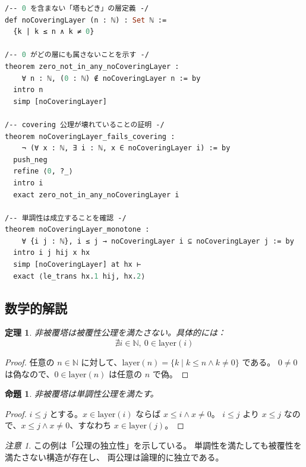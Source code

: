 \documentclass[a4paper,11pt]{ltjsarticle}
\theoremstyle{definition}
\theoremstyle{plain}
\newtheorem{theorem}[definition]{定理}
\newtheorem{proposition}[definition]{命題}
\theoremstyle{remark}
\newtheorem{remark}[definition]{注意}
\newcommand{\N}{\mathbb{N}}
\newcommand{\Layer}{\mathrm{layer}}
\begin{document}
\begin{lstlisting}[language=ML, caption={非被覆塔の Lean 実装}]
/-- 0 を含まない「塔もどき」の層定義 -/
def noCoveringLayer (n : ℕ) : Set ℕ :=
  {k | k ≤ n ∧ k ≠ 0}

/-- 0 がどの層にも属さないことを示す -/
theorem zero_not_in_any_noCoveringLayer :
    ∀ n : ℕ, (0 : ℕ) ∉ noCoveringLayer n := by
  intro n
  simp [noCoveringLayer]

/-- covering 公理が壊れていることの証明 -/
theorem noCoveringLayer_fails_covering :
    ¬ (∀ x : ℕ, ∃ i : ℕ, x ∈ noCoveringLayer i) := by
  push_neg
  refine ⟨0, ?_⟩
  intro i
  exact zero_not_in_any_noCoveringLayer i

/-- 単調性は成立することを確認 -/
theorem noCoveringLayer_monotone :
    ∀ {i j : ℕ}, i ≤ j → noCoveringLayer i ⊆ noCoveringLayer j := by
  intro i j hij x hx
  simp [noCoveringLayer] at hx ⊢
  exact ⟨le_trans hx.1 hij, hx.2⟩
\end{lstlisting}

\subsection{数学的解説}

\begin{theorem}
非被覆塔は被覆性公理を満たさない。具体的には：
\[
    \nexists i \in \N,\ 0 \in \Layer(i)
\]
\end{theorem}

\begin{proof}
任意の $n \in \N$ に対して、$\Layer(n) = \{k \mid k \leq n \land k \neq 0\}$ である。
$0 \neq 0$ は偽なので、$0 \in \Layer(n)$ は任意の $n$ で偽。
\end{proof}

\begin{proposition}
非被覆塔は単調性公理を満たす。
\end{proposition}

\begin{proof}
$i \leq j$ とする。$x \in \Layer(i)$ ならば $x \leq i \land x \neq 0$。
$i \leq j$ より $x \leq j$ なので、$x \leq j \land x \neq 0$、すなわち $x \in \Layer(j)$。
\end{proof}

\begin{remark}
この例は「公理の独立性」を示している。
単調性を満たしても被覆性を満たさない構造が存在し、
両公理は論理的に独立である。
\end{remark}

\end{document}
